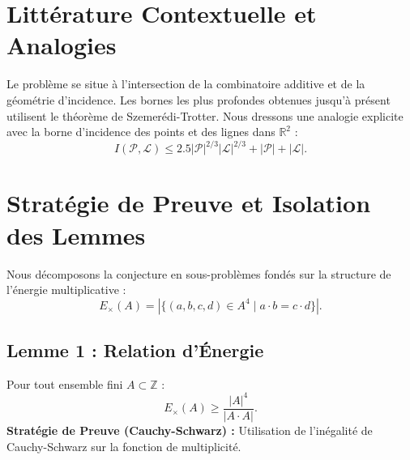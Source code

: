 \documentclass[11pt,a4paper]{article}
\begin{document}
\section{Littérature Contextuelle et Analogies}
Le problème se situe à l'intersection de la combinatoire additive et de la géométrie d'incidence. Les bornes les plus profondes obtenues jusqu'à présent utilisent le théorème de Szemerédi-Trotter.
Nous dressons une analogie explicite avec la borne d'incidence des points et des lignes dans $\mathbb{R}^2$ :
\begin{equation}
I(\mathcal{P}, \mathcal{L}) \leq 2.5 |\mathcal{P}|^{2/3} |\mathcal{L}|^{2/3} + |\mathcal{P}| + |\mathcal{L}|.
\end{equation}

\section{Stratégie de Preuve et Isolation des Lemmes}
Nous décomposons la conjecture en sous-problèmes fondés sur la structure de l'énergie multiplicative :
\begin{equation}
E_{\times}(A) = |\{(a,b,c,d) \in A^4 \mid a \cdot b = c \cdot d\}|.
\end{equation}

\subsection{Lemme 1 : Relation d'Énergie}
Pour tout ensemble fini $A \subset \mathbb{Z}$ :
\begin{equation}
E_{\times}(A) \geq \frac{|A|^4}{|A \cdot A|}.
\end{equation}
\textbf{Stratégie de Preuve (Cauchy-Schwarz) :} Utilisation de l'inégalité de Cauchy-Schwarz sur la fonction de multiplicité.
\end{document}
